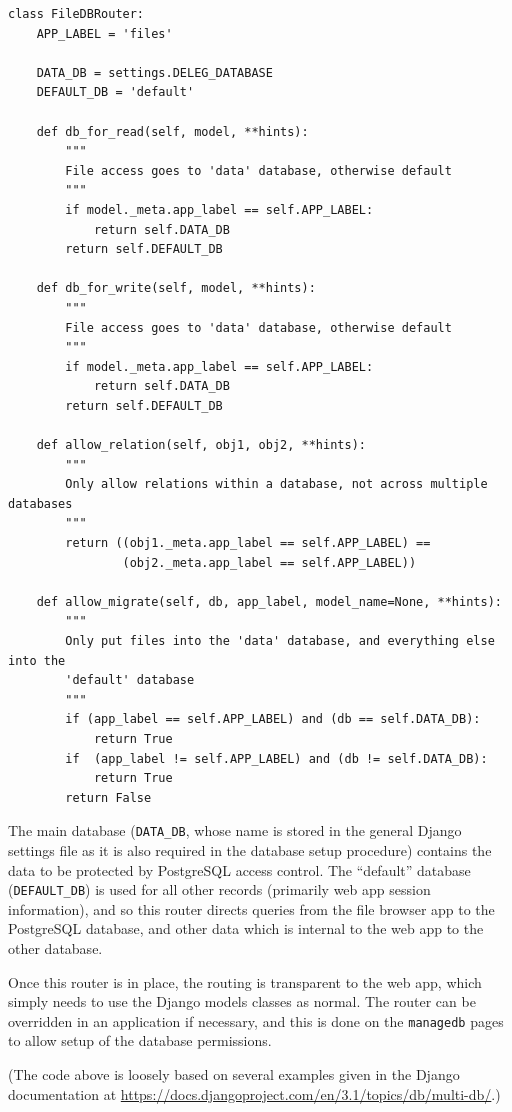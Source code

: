 \documentclass{article}
\begin{document}
\begin{verbatim}
class FileDBRouter:
    APP_LABEL = 'files'

    DATA_DB = settings.DELEG_DATABASE
    DEFAULT_DB = 'default'

    def db_for_read(self, model, **hints):
        """
        File access goes to 'data' database, otherwise default
        """
        if model._meta.app_label == self.APP_LABEL:
            return self.DATA_DB
        return self.DEFAULT_DB

    def db_for_write(self, model, **hints):
        """
        File access goes to 'data' database, otherwise default
        """
        if model._meta.app_label == self.APP_LABEL:
            return self.DATA_DB
        return self.DEFAULT_DB

    def allow_relation(self, obj1, obj2, **hints):
        """
        Only allow relations within a database, not across multiple databases
        """
        return ((obj1._meta.app_label == self.APP_LABEL) ==
                (obj2._meta.app_label == self.APP_LABEL))

    def allow_migrate(self, db, app_label, model_name=None, **hints):
        """
        Only put files into the 'data' database, and everything else into the
        'default' database
        """
        if (app_label == self.APP_LABEL) and (db == self.DATA_DB):
            return True
        if  (app_label != self.APP_LABEL) and (db != self.DATA_DB):
            return True
        return False
\end{verbatim}

The main database (\verb+DATA_DB+, whose name is stored in the general Django settings file as it is also required in the database setup procedure) contains the data to be protected by PostgreSQL access control. The ``default'' database (\verb+DEFAULT_DB+) is used for all other records (primarily web app session information), and so this router directs queries from the file browser app to the PostgreSQL database, and other data which is internal to the web app to the other database.

Once this router is in place, the routing is transparent to the web app, which simply needs to use the Django models classes as normal. The router can be overridden in an application if necessary, and this is done on the \verb+managedb+ pages to allow setup of the database permissions.

(The code above is loosely based on several examples given in the Django documentation at \url{https://docs.djangoproject.com/en/3.1/topics/db/multi-db/}.)
\end{document}
